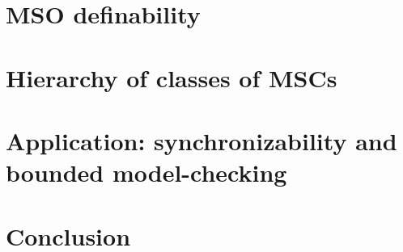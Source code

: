 \documentclass[a4paper,12pt,titlepage,oneside,openany]{book}
\begin{document}


\chapter{MSO definability}\label{CH:MSO}




%

\chapter{Hierarchy of classes of MSCs} \label{CH:HIERARCHY}



\chapter{Application: synchronizability and bounded model-checking}\label{CH:CHECKING}




\chapter{Conclusion}\label{CH:CONC}



\end{document}
